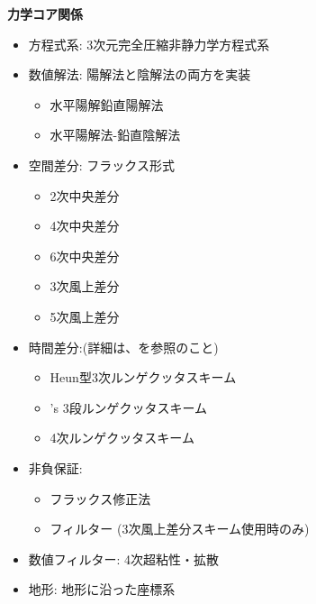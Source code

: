 {\bf 力学コア関係}
\begin{itemize}
 \item 方程式系: 3次元完全圧縮非静力学方程式系
 \item 数値解法: 陽解法と陰解法の両方を実装
   \begin{itemize}
    \item 水平陽解鉛直陽解法
    \item 水平陽解法-鉛直陰解法
   \end{itemize}
 \item 空間差分: フラックス形式
    \begin{itemize}
      \item 2次中央差分
      \item 4次中央差分
      \item 6次中央差分
      \item 3次風上差分
      \item 5次風上差分
    \end{itemize}
 \item 時間差分:(詳細は、\citet{scale_2015}を参照のこと)
    \begin{itemize}
      \item Heun型3次ルンゲクッタスキーム
      \item \citet{Wicker_2002}'s 3段ルンゲクッタスキーム 
      \item 4次ルンゲクッタスキーム
    \end{itemize}
 \item 非負保証:
    \begin{itemize}
      \item フラックス修正法\\
      \item \citet{Koren_1993}フィルター  (3次風上差分スキーム使用時のみ)
    \end{itemize}
 \item 数値フィルター: 4次超粘性・拡散
 \item 地形: 地形に沿った座標系
\end{itemize}


